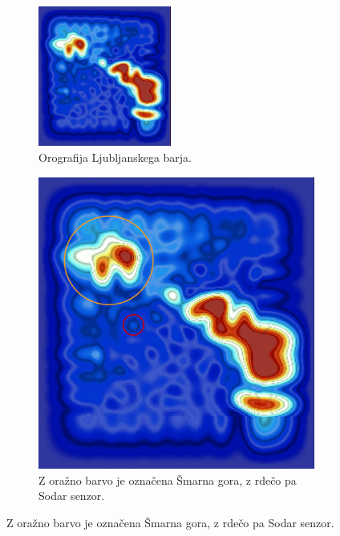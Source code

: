 \documentclass[mat2, tisk]{fmfdelo}
\begin{document}
\begin{figure}[h!]
  \centering
  \begin{subfigure}[b]{1\textwidth}
    \centering
    \includegraphics[width=0.48\textwidth]{rezultati/barje_dem.png}
    \caption{Orografija Ljubljanskega barja.}
  \end{subfigure}\hfill
  \begin{subfigure}[b]{0.48\textwidth}
    \centering
    \includegraphics[width=\textwidth]{rezultati/barje_dem2.jpeg}
    \caption{Z oražno barvo je označena Šmarna gora, z rdečo pa Sodar senzor.}
  \end{subfigure}
\end{figure}
\end{document}
